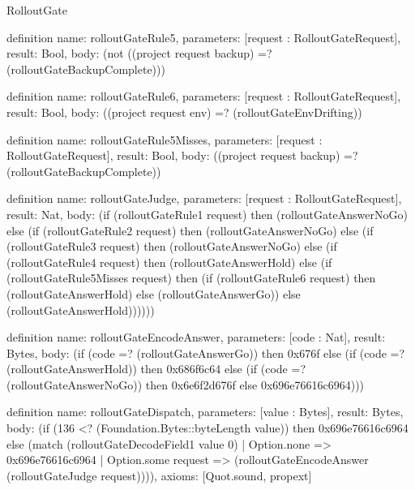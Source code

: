 \begin{lexlean}{RolloutGate}
\begin{semanticmodule}
definition{
  name: rolloutGateRule5,
  parameters: [request : RolloutGateRequest],
  result: Bool,
  body: (not ((project request backup) =? (rolloutGateBackupComplete)))
}

definition{
  name: rolloutGateRule6,
  parameters: [request : RolloutGateRequest],
  result: Bool,
  body: ((project request env) =? (rolloutGateEnvDrifting))
}

definition{
  name: rolloutGateRule5Misses,
  parameters: [request : RolloutGateRequest],
  result: Bool,
  body: ((project request backup) =? (rolloutGateBackupComplete))
}

definition{
  name: rolloutGateJudge,
  parameters: [request : RolloutGateRequest],
  result: Nat,
  body: (if (rolloutGateRule1 request) then (rolloutGateAnswerNoGo) else (if (rolloutGateRule2 request) then (rolloutGateAnswerNoGo) else (if (rolloutGateRule3 request) then (rolloutGateAnswerNoGo) else (if (rolloutGateRule4 request) then (rolloutGateAnswerHold) else (if (rolloutGateRule5Misses request) then (if (rolloutGateRule6 request) then (rolloutGateAnswerHold) else (rolloutGateAnswerGo)) else (rolloutGateAnswerHold))))))
}

definition{
  name: rolloutGateEncodeAnswer,
  parameters: [code : Nat],
  result: Bytes,
  body: (if (code =? (rolloutGateAnswerGo)) then 0x676f else (if (code =? (rolloutGateAnswerHold)) then 0x686f6c64 else (if (code =? (rolloutGateAnswerNoGo)) then 0x6e6f2d676f else 0x696e76616c6964)))
}

definition{
  name: rolloutGateDispatch,
  parameters: [value : Bytes],
  result: Bytes,
  body: (if (136 <? (Foundation.Bytes::byteLength value)) then 0x696e76616c6964 else (match (rolloutGateDecodeField1 value 0)
    | Option.none => 0x696e76616c6964
    | Option.some request => (rolloutGateEncodeAnswer (rolloutGateJudge request)))),
  axioms: [Quot.sound, propext]
}
\end{semanticmodule}
\end{lexlean}
